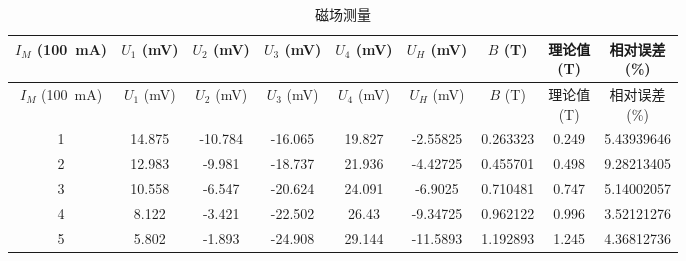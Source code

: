 \documentclass{customDoc}
\begin{document}
\begin{center}
\begin{longtable}{|c|c|c|c|c|c|c|c|c|}
  \caption{磁场测量} \\
    \hline
    \makecell[c]{$I_M$ \\ (\SI{100}{\milli\ampere})} & \makecell[c]{$U_1$ \\ (\si{\milli\volt})} & \makecell[c]{$U_2$ \\ (\si{\milli\volt})} & \makecell[c]{$U_3$ \\ (\si{\milli\volt})} & \makecell[c]{$U_4$ \\ (\si{\milli\volt})} & \makecell[c]{$U_H$ \\ (\si{\milli\volt})} & \makecell[c]{$B$ \\ (\si{\tesla})} & \makecell[c]{理论值 \\ (\si{\tesla})} & \makecell[c]{相对误差 \\ (\%)} \\
    \hline
    \endfirsthead
    \hline
    \makecell[c]{$I_M$ \\ (\SI{100}{\milli\ampere})} & \makecell[c]{$U_1$ \\ (\si{\milli\volt})} & \makecell[c]{$U_2$ \\ (\si{\milli\volt})} & \makecell[c]{$U_3$ \\ (\si{\milli\volt})} & \makecell[c]{$U_4$ \\ (\si{\milli\volt})} & \makecell[c]{$U_H$ \\ (\si{\milli\volt})} & \makecell[c]{$B$ \\ (\si{\tesla})} & \makecell[c]{理论值 \\ (\si{\tesla})} & \makecell[c]{相对误差 \\ (\%)} \\
    \hline
    \endhead
    1     & 14.875 & -10.784 & -16.065 & 19.827 & -2.55825 & 0.263323 & 0.249 & 5.43939646 \\
    \hline
    2     & 12.983 & -9.981 & -18.737 & 21.936 & -4.42725 & 0.455701 & 0.498 & 9.28213405 \\
    \hline
    3     & 10.558 & -6.547 & -20.624 & 24.091 & -6.9025 & 0.710481 & 0.747 & 5.14002057 \\
    \hline
    4     & 8.122 & -3.421 & -22.502 & 26.43 & -9.34725 & 0.962122 & 0.996 & 3.52121276 \\
    \hline
    5     & 5.802 & -1.893 & -24.908 & 29.144 & -11.5893 & 1.192893 & 1.245 & 4.36812736 \\

\end{longtable}
\end{center}
\end{document}
